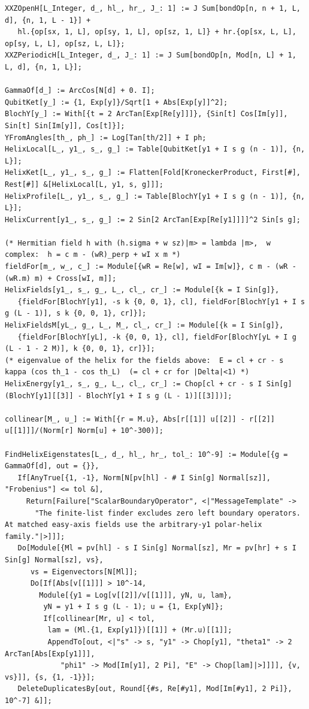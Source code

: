 \documentclass[11pt,a4paper]{article}
\theoremstyle{definition}
\begin{document}
\begin{lstlisting}
XXZOpenH[L_Integer, d_, hl_, hr_, J_: 1] := J Sum[bondOp[n, n + 1, L, d], {n, 1, L - 1}] +
   hl.{op[sx, 1, L], op[sy, 1, L], op[sz, 1, L]} + hr.{op[sx, L, L], op[sy, L, L], op[sz, L, L]};
XXZPeriodicH[L_Integer, d_, J_: 1] := J Sum[bondOp[n, Mod[n, L] + 1, L, d], {n, 1, L}];

GammaOf[d_] := ArcCos[N[d] + 0. I];
QubitKet[y_] := {1, Exp[y]}/Sqrt[1 + Abs[Exp[y]]^2];
BlochY[y_] := With[{t = 2 ArcTan[Exp[Re[y]]]}, {Sin[t] Cos[Im[y]], Sin[t] Sin[Im[y]], Cos[t]}];
YFromAngles[th_, ph_] := Log[Tan[th/2]] + I ph;
HelixLocal[L_, y1_, s_, g_] := Table[QubitKet[y1 + I s g (n - 1)], {n, L}];
HelixKet[L_, y1_, s_, g_] := Flatten[Fold[KroneckerProduct, First[#], Rest[#]] &[HelixLocal[L, y1, s, g]]];
HelixProfile[L_, y1_, s_, g_] := Table[BlochY[y1 + I s g (n - 1)], {n, L}];
HelixCurrent[y1_, s_, g_] := 2 Sin[2 ArcTan[Exp[Re[y1]]]]^2 Sin[s g];

(* Hermitian field h with (h.sigma + w sz)|m> = lambda |m>,  w complex:  h = c m - (wR)_perp + wI x m *)
fieldFor[m_, w_, c_] := Module[{wR = Re[w], wI = Im[w]}, c m - (wR - (wR.m) m) + Cross[wI, m]];
HelixFields[y1_, s_, g_, L_, cl_, cr_] := Module[{k = I Sin[g]},
   {fieldFor[BlochY[y1], -s k {0, 0, 1}, cl], fieldFor[BlochY[y1 + I s g (L - 1)], s k {0, 0, 1}, cr]}];
HelixFieldsM[yL_, g_, L_, M_, cl_, cr_] := Module[{k = I Sin[g]},
   {fieldFor[BlochY[yL], -k {0, 0, 1}, cl], fieldFor[BlochY[yL + I g (L - 1 - 2 M)], k {0, 0, 1}, cr]}];
(* eigenvalue of the helix for the fields above:  E = cl + cr - s kappa (cos th_1 - cos th_L)  (= cl + cr for |Delta|<1) *)
HelixEnergy[y1_, s_, g_, L_, cl_, cr_] := Chop[cl + cr - s I Sin[g] (BlochY[y1][[3]] - BlochY[y1 + I s g (L - 1)][[3]])];

collinear[M_, u_] := With[{r = M.u}, Abs[r[[1]] u[[2]] - r[[2]] u[[1]]]/(Norm[r] Norm[u] + 10^-300)];

FindHelixEigenstates[L_, d_, hl_, hr_, tol_: 10^-9] := Module[{g = GammaOf[d], out = {}},
   If[AnyTrue[{1, -1}, Norm[N[pv[hl] - # I Sin[g] Normal[sz]], "Frobenius"] <= tol &],
     Return[Failure["ScalarBoundaryOperator", <|"MessageTemplate" ->
       "The finite-list finder excludes zero left boundary operators. At matched easy-axis fields use the arbitrary-y1 polar-helix family."|>]]];
   Do[Module[{Ml = pv[hl] - s I Sin[g] Normal[sz], Mr = pv[hr] + s I Sin[g] Normal[sz], vs},
      vs = Eigenvectors[N[Ml]];
      Do[If[Abs[v[[1]]] > 10^-14,
        Module[{y1 = Log[v[[2]]/v[[1]]], yN, u, lam},
         yN = y1 + I s g (L - 1); u = {1, Exp[yN]};
         If[collinear[Mr, u] < tol,
          lam = (Ml.{1, Exp[y1]})[[1]] + (Mr.u)[[1]];
          AppendTo[out, <|"s" -> s, "y1" -> Chop[y1], "theta1" -> 2 ArcTan[Abs[Exp[y1]]],
             "phi1" -> Mod[Im[y1], 2 Pi], "E" -> Chop[lam]|>]]]], {v, vs}]], {s, {1, -1}}];
   DeleteDuplicatesBy[out, Round[{#s, Re[#y1], Mod[Im[#y1], 2 Pi]}, 10^-7] &]];


\end{lstlisting}
\end{document}
